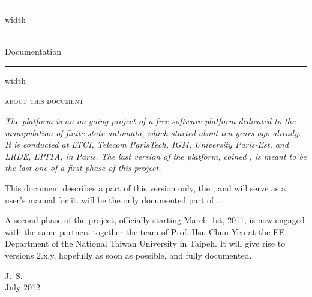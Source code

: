 \vspace*{20pt}
\vskip4pt \hrule height 4pt width \hsize \vskip4pt
\begin{center}
  \Huge 
  \vcsnv\\
  \tafkit Documentation
\end{center}
\vspace*{-1.5ex}
\vskip4pt \hrule height 4pt width \hsize \vskip4pt
\vspace*{20pt}
\vfill

    \begin{center}
        \textsc{about this document}
    \end{center}

{\itshape 
The \vcsn platform is an on-going project of a free
software platform dedicated to the manipulation of finite state
automata, which started about ten years ago already. 
It is 
conducted at LTCI, Telecom ParisTech, IGM, University Paris-Est, and 
LRDE, EPITA, in Paris.
The last version of the platform, coined \vcsnv, is meant to be the 
last one of a first phase of this project.

This document describes a part of this version only, the \tafkit, and 
will serve as a user's manual for it.
\tafkit will be the only 
documented part of \vcsnv.

A second phase of the project, officially starting March~1st, 2011, 
is now engaged with the same partners together the team of Prof. 
Hsu-Chun Yen at the EE Department of the National Taiwan University 
in Taipeh.
It will give rise to versions \vcsn 2.x.y, hopefully as soon as 
possible, and fully documented.


\begin{flushright}
    J.~S.\\
    July 2012    
\end{flushright}
}%
% 
% 
% 
% 
% 
% 
\vfill
    
